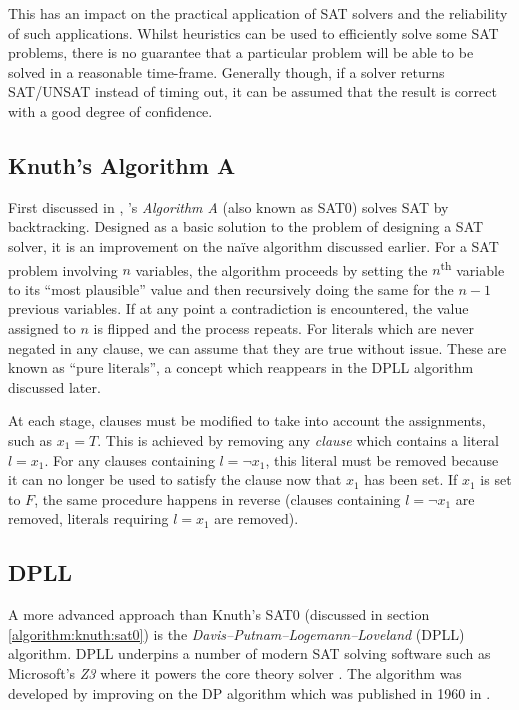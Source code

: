 \documentclass[a4paper,openany,12pt]{book}
\begin{document}
This has an impact on the practical application of SAT solvers and the reliability of such applications.
Whilst heuristics can be used to efficiently solve some SAT problems, there is no guarantee that a particular problem
will be able to be solved in a reasonable time-frame.
Generally though, if a solver returns SAT/UNSAT instead of timing out, it can be assumed that the result is correct with
a good degree of confidence.

\subsection{Knuth's Algorithm A}

First discussed in \citet{Knuth:2015:ACP:2898950}, \citeauthor{Knuth:2015:ACP:2898950}'s \emph{Algorithm A} (also known
as \textsc{SAT0}) solves SAT by backtracking.
Designed as a basic solution to the problem of designing a SAT solver, it is an improvement on the naïve algorithm
discussed earlier.
For a SAT problem involving $n$ variables, the algorithm proceeds by setting the $n$\textsuperscript{th} variable to its
``most plausible'' value and then recursively doing the same for the $n-1$ previous variables.
If at any point a contradiction is encountered, the value assigned to $n$ is flipped and the process repeats.
For literals which are never negated in any clause, we can assume that they are true without issue.
These are known as ``pure literals'', a concept which reappears in the DPLL algorithm discussed later.

At each stage, clauses must be modified to take into account the assignments, such as $x_1 = T$.
This is achieved by removing any \emph{clause} which contains a literal $l = x_1$.
For any clauses containing $l = \neg x_1$, this literal must be removed because it can no longer be used to satisfy the
clause now that $x_1$ has been set. If $x_1$ is set to $F$, the same procedure happens in reverse (clauses containing $l
= \neg x_1$ are removed, literals requiring $l = x_1$ are removed).

\label{algorithm:knuth:sat0}

\subsection{DPLL}

A more advanced approach than Knuth's SAT0 (discussed in section \ref{algorithm:knuth:sat0}) is the
\emph{Davis–Putnam–Logemann–Loveland} (DPLL) algorithm.
DPLL underpins a number of modern SAT solving software such as Microsoft's \emph{Z3} where it powers the core theory
solver \citep{de2008z3}.
The algorithm was developed by improving on the DP algorithm which was published in 1960 in
\citet{Davis:1960:CPQ:321033.321034}.
\end{document}
